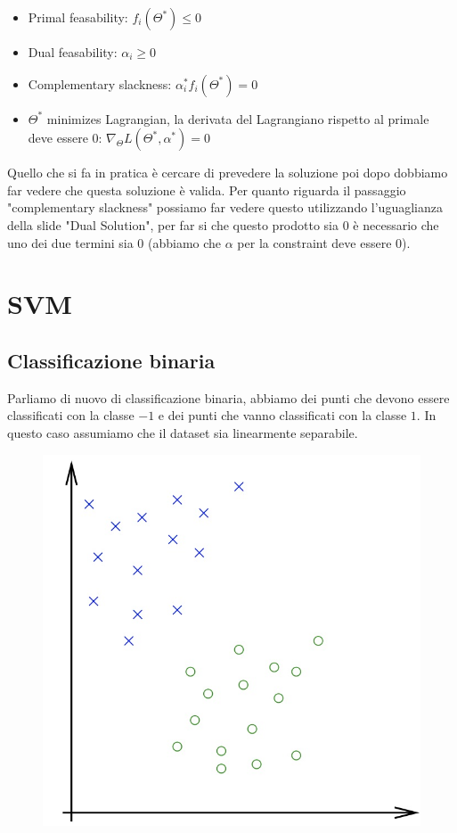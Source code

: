 \documentclass[14pt]{extreport}
\begin{document}
\begin{itemize}
	\item Primal feasability: $f_i(\Theta^*) \leq 0$
	\item Dual feasability: $\alpha_i \geq 0$
	\item Complementary slackness: $\alpha_i^*f_i(\Theta^*) = 0$
	\item $\Theta^*$ minimizes Lagrangian, la derivata del Lagrangiano rispetto al primale deve essere 0: $\nabla_\Theta L(\Theta^*, \alpha^*) = 0$
\end{itemize}

Quello che si fa in pratica è cercare di prevedere la soluzione poi dopo dobbiamo far vedere che questa soluzione è valida. Per quanto riguarda il
passaggio "complementary slackness" possiamo far vedere questo utilizzando l'uguaglianza della slide "Dual Solution", per far si che questo prodotto
sia 0 è necessario che uno dei due termini sia 0 (abbiamo che $\alpha$ per la constraint deve essere 0).


\chapter{SVM}

\section{Classificazione binaria}

Parliamo di nuovo di classificazione binaria, abbiamo dei punti che devono essere classificati con la classe $-1$ e dei punti che vanno classificati
con la classe $1$. In questo caso assumiamo che il dataset sia linearmente separabile.
\begin{figure}[H]
	\centering
	\includegraphics[width=0.4\linewidth]{310.jpeg}
\end{figure}
\end{document}
